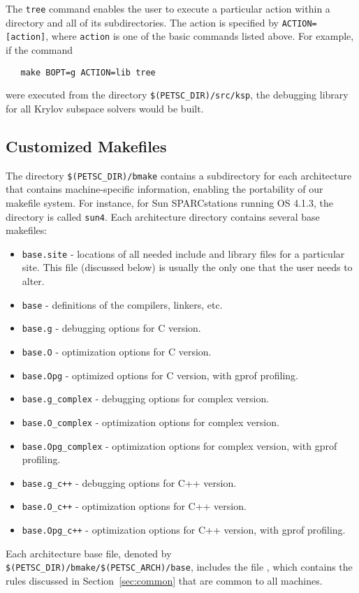 The {\tt tree} command enables the user to execute a particular action
within a directory and all of its subdirectories.  The action is specified
by {\tt ACTION=[action]}, where {\tt action} is one of the basic commands
listed above. For example, if the command
\begin{verbatim}
   make BOPT=g ACTION=lib tree
\end{verbatim}
were executed from the directory {\tt \$(PETSC\_DIR)/src/ksp},
the debugging library for all Krylov subspace solvers would be built.

\subsection{Customized Makefiles}
\label{sec:custom}

The directory {\tt \$(PETSC\_DIR)/bmake} contains a subdirectory for each 
architecture that contains machine-specific information, enabling the
portability of our makefile system.
For instance, for Sun SPARCstations running OS 4.1.3, the 
directory is called {\tt sun4}.  Each architecture directory contains
several base makefiles:
\begin{itemize}
\item {\tt base.site} - locations of all needed include
      and library files for a particular site. This file (discussed
      below) is usually the only one that the user needs to alter.
\item {\tt base} - definitions of the compilers,
      linkers, etc.
\item {\tt base.g} - debugging options for C version.
\item {\tt base.O} - optimization options for C version.
\item {\tt base.Opg} - optimized options for C version, with gprof profiling.
\item {\tt base.g\_complex} - debugging options for complex version.
\item {\tt base.O\_complex} - optimization options for complex version.
\item {\tt base.Opg\_complex} - optimization options for complex version, with 
                              gprof profiling.
\item {\tt base.g\_c++} - debugging options for C++ version.
\item {\tt base.O\_c++} - optimization options for C++ version.
\item {\tt base.Opg\_c++} - optimization options for C++ version, with gprof
                            profiling.
\end{itemize}
Each architecture base file, denoted by
{\tt \$(PETSC\_DIR)/bmake/\$(PETSC\_ARCH)/base},
includes the file ,
which contains the rules discussed in Section~\ref{sec:common}
that are common to all machines.

